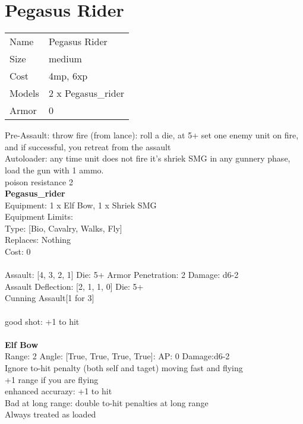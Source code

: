 \pagebreak

\section{ Pegasus Rider }

\begin{tabular}{ll}
  Name & Pegasus Rider \\
  Size & medium\\
  Cost & 4mp, 6xp\\
  Models & 2 x Pegasus_rider\\
  Armor & 0\\
\end{tabular}

\noindent Pre-Assault: throw fire (from lance): roll a die, at 5+ set one enemy unit on fire, and if successful, you retreat from the assault\\ 
Autoloader: any time unit does not fire it's shriek SMG in any gunnery phase, load the gun with 1 ammo.\\ 
poison resistance 2\\ 


{\bf Pegasus_rider } \\
Equipment: 1 x Elf Bow, 1 x Shriek SMG \\
Equipment Limits:  \\
Type: [Bio, Cavalry, Walks, Fly] \\
Replaces: Nothing \\
Cost: 0\\
\ \\
Assault: [4, 3, 2, 1] Die: 5+ Armor Penetration: 2 Damage: d6-2 \\
Assault Deflection: [2, 1, 1, 0] Die: 5+\\
\indent Cunning Assault[1 for 3]\\ 
 
\ \\
good shot: +1 to hit\\ 

\ \\
{\bf Elf Bow } \\



Range: 2  Angle: [True, True, True, True]: AP: 0 Damage:d6-2 \\
Ignore to-hit penalty (both self and taget) moving fast and flying\\ 
+1 range if you are flying\\ 
enhanced accurazy: +1 to hit\\ 
Bad at long range: double to-hit penalties at long range\\ 
Always treated as loaded\\ 




